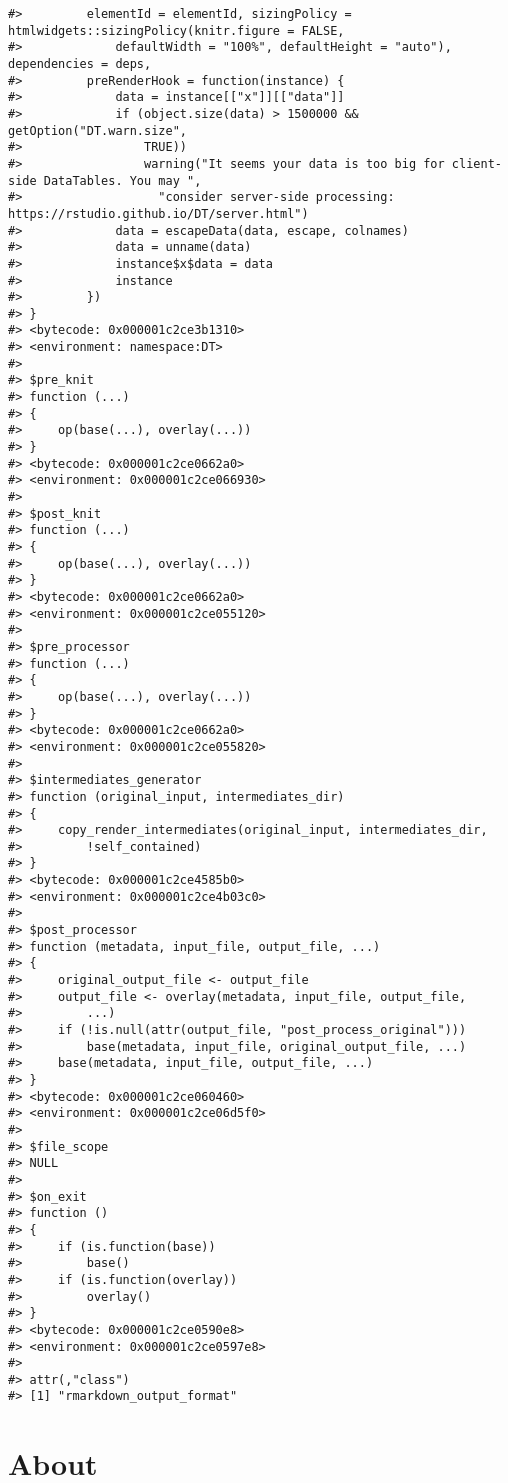 \documentclass[
]{book}
\begin{document}
\begin{verbatim}
#>         elementId = elementId, sizingPolicy = htmlwidgets::sizingPolicy(knitr.figure = FALSE, 
#>             defaultWidth = "100%", defaultHeight = "auto"), dependencies = deps, 
#>         preRenderHook = function(instance) {
#>             data = instance[["x"]][["data"]]
#>             if (object.size(data) > 1500000 && getOption("DT.warn.size", 
#>                 TRUE)) 
#>                 warning("It seems your data is too big for client-side DataTables. You may ", 
#>                   "consider server-side processing: https://rstudio.github.io/DT/server.html")
#>             data = escapeData(data, escape, colnames)
#>             data = unname(data)
#>             instance$x$data = data
#>             instance
#>         })
#> }
#> <bytecode: 0x000001c2ce3b1310>
#> <environment: namespace:DT>
#> 
#> $pre_knit
#> function (...) 
#> {
#>     op(base(...), overlay(...))
#> }
#> <bytecode: 0x000001c2ce0662a0>
#> <environment: 0x000001c2ce066930>
#> 
#> $post_knit
#> function (...) 
#> {
#>     op(base(...), overlay(...))
#> }
#> <bytecode: 0x000001c2ce0662a0>
#> <environment: 0x000001c2ce055120>
#> 
#> $pre_processor
#> function (...) 
#> {
#>     op(base(...), overlay(...))
#> }
#> <bytecode: 0x000001c2ce0662a0>
#> <environment: 0x000001c2ce055820>
#> 
#> $intermediates_generator
#> function (original_input, intermediates_dir) 
#> {
#>     copy_render_intermediates(original_input, intermediates_dir, 
#>         !self_contained)
#> }
#> <bytecode: 0x000001c2ce4585b0>
#> <environment: 0x000001c2ce4b03c0>
#> 
#> $post_processor
#> function (metadata, input_file, output_file, ...) 
#> {
#>     original_output_file <- output_file
#>     output_file <- overlay(metadata, input_file, output_file, 
#>         ...)
#>     if (!is.null(attr(output_file, "post_process_original"))) 
#>         base(metadata, input_file, original_output_file, ...)
#>     base(metadata, input_file, output_file, ...)
#> }
#> <bytecode: 0x000001c2ce060460>
#> <environment: 0x000001c2ce06d5f0>
#> 
#> $file_scope
#> NULL
#> 
#> $on_exit
#> function () 
#> {
#>     if (is.function(base)) 
#>         base()
#>     if (is.function(overlay)) 
#>         overlay()
#> }
#> <bytecode: 0x000001c2ce0590e8>
#> <environment: 0x000001c2ce0597e8>
#> 
#> attr(,"class")
#> [1] "rmarkdown_output_format"
\end{verbatim}

\chapter*{About}\label{about}
\end{document}
